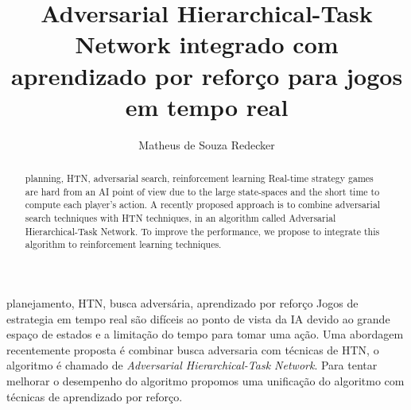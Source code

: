 \documentclass[portuguese,oneside]{tcc}
\author{Matheus de Souza Redecker}
\title{Adversarial Hierarchical-Task Network integrado com aprendizado por reforço para jogos em tempo real}
      {Adversarial Hierarchical-Task Network integrated with reinforcement learning for Real-Time Games}
\begin{document}




\begin{resumo}{planejamento, HTN, busca adversária, aprendizado por reforço}
Jogos de estrategia em tempo real são difíceis ao ponto de vista da IA devido ao grande espaço de estados e a limitação do tempo para tomar uma ação. 
Uma abordagem recentemente proposta é combinar busca adversaria com técnicas de HTN, o algoritmo é chamado de \textit{Adversarial Hierarchical-Task Network}.
Para tentar melhorar o desempenho do algoritmo propomos uma unificação do algoritmo com técnicas de aprendizado por reforço. 
\end{resumo}

\begin{abstract}{planning, HTN, adversarial search, reinforcement learning}
Real-time strategy games are hard from an AI point of view due to the large state-spaces and the short time to compute each player's action. 
A recently proposed approach is to combine adversarial search techniques with HTN techniques, in an algorithm called Adversarial Hierarchical-Task Network. 
To improve the performance, we propose to integrate this algorithm to reinforcement learning techniques. 
\end{abstract}
\end{document}
